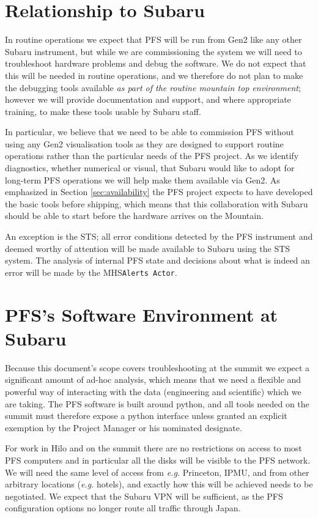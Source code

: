 \documentclass[12pt]{article}
\newcommand{\eg}{\textit{e.g.}\xspace}
\newcommand{\MHS}{\gls{MHS}\xspace}
\newcommand{\PFS}{\gls{PFS}\xspace}
\newcommand{\secRef}[1]{Section \ref{sec:#1}}
\begin{document}
\section{Relationship to Subaru}

In routine operations we expect that \PFS will be run from \gls{Gen2} like any other Subaru instrument,
but while we are commissioning the system we will need to troubleshoot hardware problems and debug
the software.  We do not expect that this will be needed in routine operations, and we therefore do
not plan to make the debugging tools available \textit{as part of the routine mountain top environment};
however we will provide documentation and support, and where appropriate training, to make these tools
usable by Subaru staff.

In particular, we believe that we need to be able to commission \PFS without using any \gls{Gen2} visualisation
tools as they are designed to support routine operations rather than the particular needs of the \PFS project.
As we identify diagnostics, whether numerical or visual, that Subaru would like to adopt for long-term
\PFS operations we will help make them available via \gls{Gen2}.  As emphasized in \secRef{availability}
the \PFS project expects to have developed the basic tools before shipping, which means that this
collaboration with Subaru should be able to start before the hardware arrives on the Mountain.

An exception is the \gls{STS}; all error conditions detected by the \PFS instrument and deemed worthy
of attention will be made available to Subaru using the \gls{STS} system.  The analysis of
internal \PFS state and decisions about what is indeed an error will be made by the \MHS \texttt{Alerts Actor}.

\section{PFS's Software Environment at Subaru}

Because this document's scope covers troubleshooting at the summit we expect a significant amount of ad-hoc
analysis, which means that we need a flexible and powerful way of interacting with the data (engineering and
scientific) which we are taking.  The \PFS software is built around python, and all tools needed on the summit
must therefore expose a python interface unless granted an explicit exemption by the Project Manager or
his nominated designate.

For work in Hilo and on the summit there are no restrictions on access to most \PFS computers and in
particular all the disks will be visible to the \PFS network.  We will need the same level of access from \eg
Princeton, IPMU, and from other arbitrary locations (\eg hotels), and exactly how this will be achieved needs
to be negotiated.  We expect that the Subaru \gls{VPN} will be sufficient, as the \PFS
configuration options no longer route all traffic through Japan.
\end{document}
